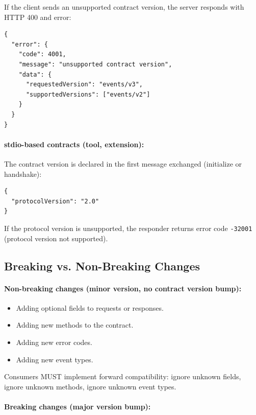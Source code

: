 If the client sends an unsupported contract version, the server responds with
HTTP 400 and error:

\begin{verbatim}
{
  "error": {
    "code": 4001,
    "message": "unsupported contract version",
    "data": {
      "requestedVersion": "events/v3",
      "supportedVersions": ["events/v2"]
    }
  }
}
\end{verbatim}

\paragraph{stdio-based contracts (tool, extension):}

The contract version is declared in the first message exchanged (initialize or
handshake):

\begin{verbatim}
{
  "protocolVersion": "2.0"
}
\end{verbatim}

If the protocol version is unsupported, the responder returns error code
\texttt{-32001} (protocol version not supported).

\subsection{Breaking vs. Non-Breaking Changes}

\paragraph{Non-breaking changes (minor version, no contract version bump):}

\begin{itemize}
  \item Adding optional fields to requests or responses.
  \item Adding new methods to the contract.
  \item Adding new error codes.
  \item Adding new event types.
\end{itemize}

Consumers MUST implement forward compatibility: ignore unknown fields, ignore
unknown methods, ignore unknown event types.

\paragraph{Breaking changes (major version bump):}


